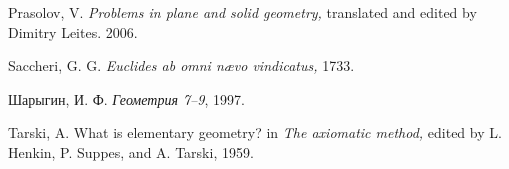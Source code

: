 \begin{thebibliography}{52}
Prasolov, V.
\textit{Problems in plane and solid geometry,} 
translated and edited by Dimitry Leites. 2006.

Saccheri, G. G.
\textit{Euclides ab omni n\ae vo vindicatus,} 
1733.


\begin{otherlanguage}{russian}
Шарыгин, И. Ф.
\textit{Геометрия 7--9}, %
1997.
\end{otherlanguage}

 Tarski, A.
What is elementary geometry? in
\textit{The axiomatic method,} edited by L. Henkin, P. Suppes, and A. Tarski,
1959.



\end{thebibliography}
